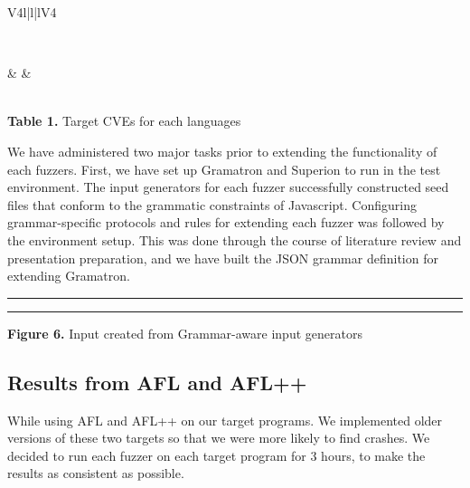 \documentclass[12pt]{diazessay}
\begin{document}
\begin{table}[h!]
{\begin{tabular}{V{4}l|l|lV{4}}
{\begin{tabular}[c]{@{}c@{}}
	\end{tabular}} \\ \hline
	 & 
	 &
	 \\ 
	
\end{tabular}
}
\vspace{6mm}\\ \textbf{Table 1.} Target CVEs for each languages
\end{table}

We have administered two major tasks prior to extending the functionality of each fuzzers.
First, we have set up Gramatron and Superion to run in the test environment.
The input generators for each fuzzer successfully constructed seed files \cite{superion-example}\cite{gramatron-example}that conform to the grammatic constraints of Javascript.
Configuring grammar-specific protocols and rules for extending each fuzzer was followed by the environment setup.
This was done through the course of literature review and presentation preparation, and we have built the JSON grammar definition\cite{json-source.json} for extending Gramatron.

\vspace{10mm}
\hrule height 0.4mm
\begingroup \fontsize{12pt}{12pt} \selectfont \begin{alltt}

\end{alltt} \vspace{-6mm} \endgroup \hrule height 0.4mm
\vspace{6mm}
\centerline{\textbf{Figure 6.} Input created from Grammar-aware input generators}

\subsection*{Results from AFL and AFL++}
While using AFL and AFL++ on our target programs. We implemented older versions of these two targets so that we were more likely to find crashes. We decided to run each fuzzer on each target program for 3 hours, to make the results as consistent as possible.
\end{document}
